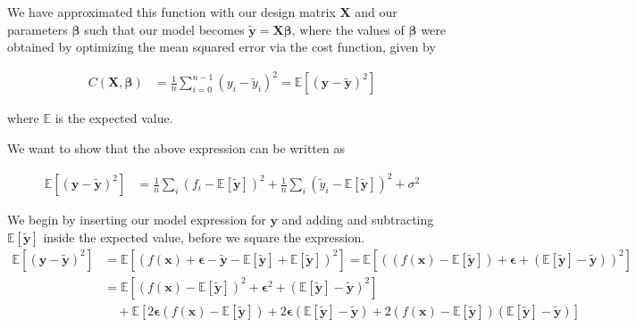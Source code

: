 \documentclass[reprint,english,notitlepage,aps,nobalancelastpage,nofootinbib]{revtex4-1}  %
\newcommand{\expy}{\mathbb{E}[\mathbf{\tilde{y}}]}
\newcommand{\closed}[1]{\left({#1}\right)}
\newcommand{\bracket}[1]{\left[{#1}\right]}
\begin{document}
We have approximated this function with our design matrix $\mathbf{X}$ and our parameters $\bm{\beta}$ such that our model becomes $\mathbf{\tilde{y}}=\mathbf{X}\bm{\beta}$, where the values of $\bm{\beta}$ were obtained by optimizing the mean squared error via the cost function, given by

\begin{align*}
  C(\mathbf{X}, \bm{\beta}) &= \frac{1}{n} \sum_{i=0}^{n-1} (y_i - \tilde{y}_i)^2 = \mathbb{E}\left[(\mathbf{y} - \mathbf{\tilde{y}})^2\right]
\end{align*}


where $\mathbb{E}$ is the expected value. %

We want to show that the above expression can be written as

\begin{align*}
  \mathbb{E}\left[(\mathbf{y} - \mathbf{\tilde{y}})^2\right] &= \frac{1}{n} \sum_i (f_i - \expy)^2 + \frac{1}{n}\sum_i (\tilde{y}_i - \expy )^2 + \sigma^2
\end{align*}

We begin by inserting our model expression for $\mathbf{y}$ and adding and subtracting $\expy$ inside the expected value, before we square the expression.
\begin{align*}
  \mathbb{E}\bracket{(\mathbf{y} - \mathbf{\tilde{y}})^2} &= \mathbb{E}\bracket{(f(\mathbf{x}) + \bm{\epsilon} - \mathbf{\tilde{y}} - \expy + \expy)^2} = \mathbb{E}\bracket{\closed{(f(\mathbf{x}) - \expy) + \bm{\epsilon} + (\expy - \mathbf{\tilde{y}}) }^2 } \\
  &= \mathbb{E}\bracket{(f(\mathbf{x}) - \expy)^2 + \bm{\epsilon}^2 + (\expy - \mathbf{\tilde{y}})^2} \\
  &\quad+ \mathbb{E}\bracket{2\bm{\epsilon} (f(\mathbf{x}) - \expy) + 2\bm{\epsilon}(\expy - \mathbf{\tilde{y}}) + 2 (f(\mathbf{x}) - \expy)(\expy - \mathbf{\tilde{y}})}
\end{align*}
\end{document}
